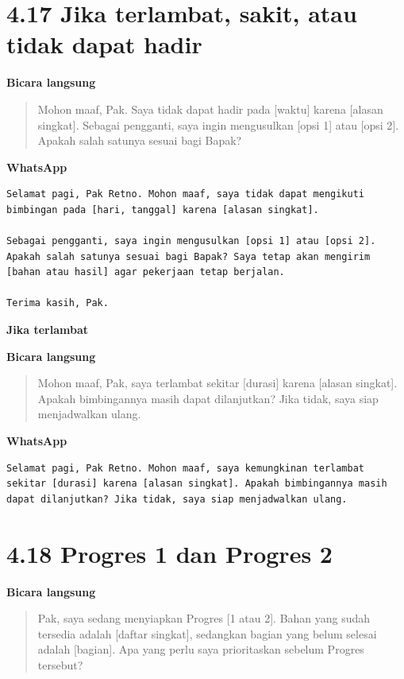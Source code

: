 \documentclass[
  indonesian,
]{article}
\renewcommand{\subsection}{\section}
\begin{document}
\subsection{4.17 Jika terlambat, sakit, atau tidak dapat
hadir}\label{jika-terlambat-sakit-atau-tidak-dapat-hadir}

\textbf{Bicara langsung}

\begin{quote}
Mohon maaf, Pak. Saya tidak dapat hadir pada {[}waktu{]} karena
{[}alasan singkat{]}. Sebagai pengganti, saya ingin mengusulkan {[}opsi
1{]} atau {[}opsi 2{]}. Apakah salah satunya sesuai bagi Bapak?
\end{quote}

\textbf{WhatsApp}

\begin{verbatim}
Selamat pagi, Pak Retno. Mohon maaf, saya tidak dapat mengikuti bimbingan pada [hari, tanggal] karena [alasan singkat].

Sebagai pengganti, saya ingin mengusulkan [opsi 1] atau [opsi 2]. Apakah salah satunya sesuai bagi Bapak? Saya tetap akan mengirim [bahan atau hasil] agar pekerjaan tetap berjalan.

Terima kasih, Pak.
\end{verbatim}

\textbf{Jika terlambat}

\textbf{Bicara langsung}

\begin{quote}
Mohon maaf, Pak, saya terlambat sekitar {[}durasi{]} karena {[}alasan
singkat{]}. Apakah bimbingannya masih dapat dilanjutkan? Jika tidak,
saya siap menjadwalkan ulang.
\end{quote}

\textbf{WhatsApp}

\begin{verbatim}
Selamat pagi, Pak Retno. Mohon maaf, saya kemungkinan terlambat sekitar [durasi] karena [alasan singkat]. Apakah bimbingannya masih dapat dilanjutkan? Jika tidak, saya siap menjadwalkan ulang.
\end{verbatim}

\subsection{4.18 Progres 1 dan Progres 2}\label{progres-1-dan-progres-2}

\textbf{Bicara langsung}

\begin{quote}
Pak, saya sedang menyiapkan Progres {[}1 atau 2{]}. Bahan yang sudah
tersedia adalah {[}daftar singkat{]}, sedangkan bagian yang belum
selesai adalah {[}bagian{]}. Apa yang perlu saya prioritaskan sebelum
Progres tersebut?
\end{quote}
\end{document}

